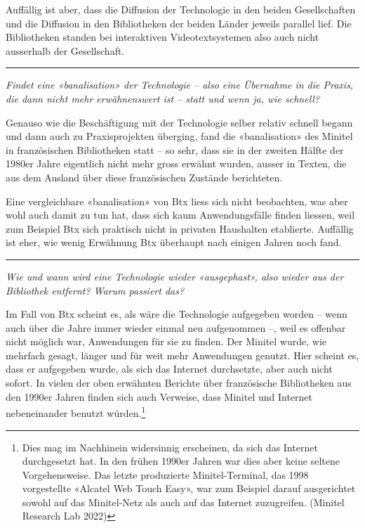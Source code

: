 \documentclass[a4paper,
fontsize=11pt,
oneside,
numbers=noperiodatend,
parskip=half-,
bibliography=totoc,
final
]{scrartcl}
\begin{document}
Auffällig ist aber, dass die Diffusion der Technologie in den beiden
Gesellschaften und die Diffusion in den Bibliotheken der beiden Länder
jeweils parallel lief. Die Bibliotheken standen bei interaktiven
Videotextsystemen also auch nicht ausserhalb der Gesellschaft.

\begin{center}\rule{0.5\linewidth}{0.5pt}\end{center}

\emph{Findet eine «banalisation» der Technologie -- also eine Übernahme
in die Praxis, die dann nicht mehr erwähnenswert ist -- statt und wenn
ja, wie schnell?}

Genauso wie die Beschäftigung mit der Technologie selber relativ schnell
begann und dann auch zu Praxisprojekten überging, fand die
«banalisation» des Minitel in französischen Bibliotheken statt -- so
sehr, dass sie in der zweiten Hälfte der 1980er Jahre eigentlich nicht
mehr gross erwähnt wurden, ausser in Texten, die aus dem Ausland über
diese französischen Zustände berichteten.

Eine vergleichbare «banalisation» von Btx liess sich nicht beobachten,
was aber wohl auch damit zu tun hat, dass sich kaum Anwendungsfälle
finden liessen, weil zum Beispiel Btx sich praktisch nicht in privaten
Haushalten etablierte. Auffällig ist eher, wie wenig Erwähnung Btx
überhaupt nach einigen Jahren noch fand.

\begin{center}\rule{0.5\linewidth}{0.5pt}\end{center}

\emph{Wie und wann wird eine Technologie wieder «ausgephast», also
wieder aus der Bibliothek entfernt? Warum passiert das?}

Im Fall von Btx scheint es, als wäre die Technologie aufgegeben worden
-- wenn auch über die Jahre immer wieder einmal neu aufgenommen --, weil
es offenbar nicht möglich war, Anwendungen für sie zu finden. Der
Minitel wurde, wie mehrfach gesagt, länger und für weit mehr Anwendungen
genutzt. Hier scheint es, dass er aufgegeben wurde, als sich das
Internet durchsetzte, aber auch nicht sofort. In vielen der oben
erwähnten Berichte über französische Bibliotheken aus den 1990er Jahren
finden sich auch Verweise, dass Minitel und Internet nebeneinander
benutzt würden.\footnote{Dies mag im Nachhinein widersinnig erscheinen,
  da sich das Internet durchgesetzt hat. In den frühen 1990er Jahren war
  dies aber keine seltene Vorgehensweise. Das letzte produzierte
  Minitel-Terminal, das 1998 vorgestellte «Alcatel Web Touch Easy», war
  zum Beispiel darauf ausgerichtet sowohl auf das Minitel-Netz als auch
  auf das Internet zuzugreifen. (Minitel Research Lab 2022)}
\end{document}
